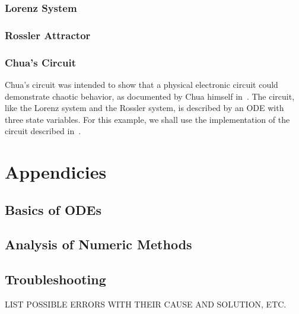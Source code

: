 \documentclass[letterpaper,10pt]{book}
\begin{document}
    \section{Lorenz System}
    \section{Rossler Attractor}
    \section{Chua's Circuit}
      Chua's circuit was intended to show that a physical electronic circuit could demonstrate chaotic behavior, as documented by Chua himself in~\cite{chua1992genesis}.  The circuit, like the Lorenz system and the Rossler system, is described by an ODE with three state variables.  For this example, we shall use the implementation of the circuit described in~\cite{kennedy1992robust}.


\part{Appendicies}
  \chapter{Basics of ODEs}
  
  \chapter{Analysis of Numeric Methods}
  
  \chapter{Troubleshooting}
    LIST POSSIBLE ERRORS WITH THEIR CAUSE AND SOLUTION, ETC.
    


  
\printindex
\end{document}

